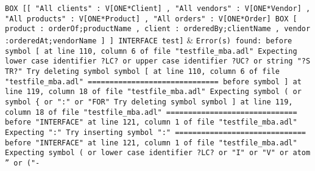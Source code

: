 \texttt{BOX [[ "All clients"  : V[ONE*Client]\newline
     , "All vendors"  : V[ONE*Vendor] \newline
     , "All products" : V[ONE*Product]\newline
     , "All orders"   : V[ONE*Order]\newline
       BOX [ product : orderOf;productName\newline
           , client  : orderedBy;clientName\newline
           , vendor  :orderedAt;vendorName\newline
           ] \newline
     ]\newline
     INTERFACE test]} & \texttt{Error(s) found:\newline
  \newline
  before symbol [ at line 110, column 6 of file "testfile\_mba.adl"\newline
  Expecting lower case identifier ?LC? or upper case identifier ?UC? or string "?S\newline
  TR?"\newline
  Try deleting symbol symbol [ at line 110, column 6 of file "testfile\_mba.adl"\newline
  \newline
  ==============================\newline
  \newline
  before symbol ] at line 119, column 18 of file "testfile\_mba.adl"\newline
  Expecting symbol ( or symbol \{ or ":" or "FOR"\newline
  Try deleting symbol symbol ] at line 119, column 18 of file "testfile\_mba.adl"\newline
  \newline
  ==============================\newline
  \newline
  before "INTERFACE" at line 121, column 1 of file "testfile\_mba.adl"\newline
  Expecting ":"\newline
  Try inserting symbol ":"\newline
  \newline
  ==============================\newline
  \newline
  before "INTERFACE" at line 121, column 1 of file "testfile\_mba.adl"\newline
  Expecting symbol ( or lower case identifier ?LC? or "I" or "V" or atom '' or ("-\newline
}
